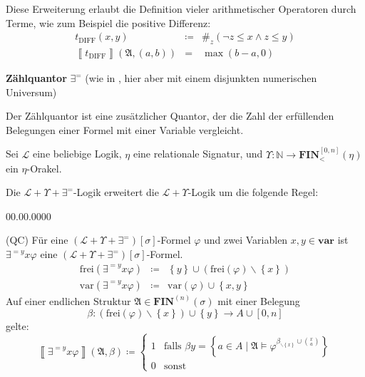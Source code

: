 \begin{example*}
Diese Erweiterung erlaubt die Definition vieler arithmetischer Operatoren
durch Terme, wie zum Beispiel die positive Differenz:
\begin{eqnarray*}
t_{\mathrm{DIFF}}\left(x,y\right) & \coloneqq & \#_{z}\left(\neg z\leqslant x\wedge z\leqslant y\right)\\
\left\llbracket t_{\mathrm{DIFF}}\right\rrbracket \left(\mathfrak{A},\left(a,b\right)\right) & = & \max\left(b-a,0\right)
\end{eqnarray*}
\end{example*}
\begin{defn}
\textbf{Zählquantor }$\exists^{=}$ (wie in \cite{Schweikardt:2005:AFL:1071596.1071602},
hier aber mit einem disjunkten numerischen Universum)

Der Zählquantor ist eine zusätzlicher Quantor, der die Zahl der erfüllenden
Belegungen einer Formel mit einer Variable vergleicht.

Sei $\mathcal{L}$ eine beliebige Logik, $\eta$ eine relationale
Signatur, und $\Upsilon:\mathbb{N}\rightarrow\mathbf{FIN}_{<}^{\left[0,n\right]}\left(\eta\right)$
ein $\eta$-Orakel.

Die $\mathcal{L}+\Upsilon+\exists^{=}$-Logik erweitert die $\mathcal{L}+\Upsilon$-Logik
um die folgende Regel:

\begin{labeling}{00.00.0000}
\item [{(QC)}] Für eine $\left(\mathcal{L}+\Upsilon+\exists^{=}\right)\left[\sigma\right]$-Formel
$\varphi$ und zwei Variablen $x,y\in\mathbf{var}$ ist $\exists^{=y}x\varphi$
eine $\left(\mathcal{L}+\Upsilon+\exists^{=}\right)\left[\sigma\right]$-Formel.
\begin{eqnarray*}
\mathrm{frei}\left(\exists^{=y}x\varphi\right) & \coloneqq & \left\{ y\right\} \cup\left(\mathrm{frei}\left(\varphi\right)\backslash\left\{ x\right\} \right)\\
\mathrm{var}\left(\exists^{=y}x\varphi\right) & \coloneqq & \mathrm{var}\left(\varphi\right)\cup\left\{ x,y\right\} 
\end{eqnarray*}
Auf einer endlichen Struktur $\mathfrak{A}\in\mathbf{FIN}^{\left(n\right)}\left(\sigma\right)$
mit einer Belegung 
\[
\beta:\left(\mathrm{frei}\left(\varphi\right)\backslash\left\{ x\right\} \right)\cup\left\{ y\right\} \rightarrow A\cup\left[0,n\right]
\]
gelte: 
\[
\left\llbracket \exists^{=y}x\varphi\right\rrbracket \left(\mathfrak{A},\beta\right)\coloneqq\begin{cases}
1 & \mathrm{falls}\,\,\beta y=\left\{ a\in A\mid\mathfrak{A}\models\varphi^{\beta_{\backslash\left\{ x\right\} }\cup\binom{x}{a}}\right\} \\
0 & \mathrm{sonst}
\end{cases}
\]
\end{labeling}
\end{defn}
